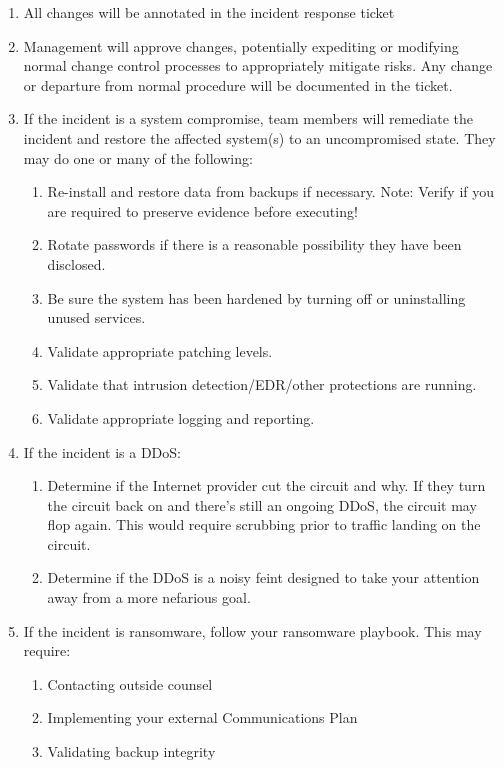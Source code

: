 \documentclass[../main.tex]{subfiles}
\begin{document}
\begin{enumerate}
    \item All changes will be annotated in the incident response ticket
    \item Management will approve changes, potentially expediting or modifying normal change control processes to appropriately mitigate risks.
    Any change or departure from normal procedure will be documented in the ticket.
    \item If the incident is a system compromise, team members will remediate the incident and restore the affected system(s) to an uncompromised state.
    They may do one or many of the following:
    \begin{enumerate}
        \item Re-install and restore data from backups if necessary. Note: Verify if you are required to preserve evidence before executing!
        \item Rotate passwords if there is a reasonable possibility they have been disclosed.
        \item Be sure the system has been hardened by turning off or uninstalling unused services.
        \item Validate appropriate patching levels.
        \item Validate that intrusion detection/EDR/other protections are running.
        \item Validate appropriate logging and reporting.
    \end{enumerate}
    \item If the incident is a DDoS:
    \begin{enumerate}
        \item Determine if the Internet provider cut the circuit and why. If they turn the circuit back on and there's still an ongoing DDoS,
        the circuit may flop again. This would require scrubbing prior to traffic landing on the circuit.
        \item Determine if the DDoS is a noisy feint designed to take your attention away from a more nefarious goal.
    \end{enumerate}
    \item If the incident is ransomware, follow your ransomware playbook. This may require:
    \begin{enumerate}
        \item Contacting outside counsel
        \item Implementing your external Communications Plan
        \item Validating backup integrity

\end{enumerate}
\end{enumerate}
\end{document}
